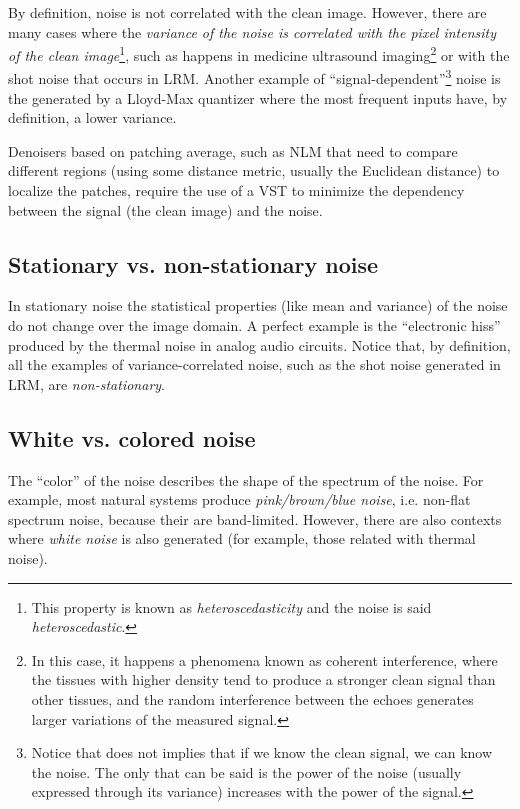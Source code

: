 By definition, noise is not correlated with the clean image. However,
there are many cases where the \emph{variance of the noise is
correlated with the pixel intensity of the clean image}\footnote{This
property is known as \emph{heteroscedasticity} and the noise is said
\emph{heteroscedastic}.}, such as happens in medicine ultrasound
imaging\footnote{In this case, it happens a phenomena known as
coherent interference, where the tissues with higher density tend to
produce a stronger clean signal than other tissues, and the random
interference between the echoes generates larger variations of the
measured signal.} or with the shot noise that occurs in
\gls{LRM}. Another example of ``signal-dependent''\footnote{Notice
that does not implies that if we know the clean signal, we can know
the noise. The only that can be said is the power of the noise
(usually expressed through its variance) increases with the power of
the signal.} noise is the generated by a Lloyd-Max quantizer where the
most frequent inputs have, by definition, a lower variance.

Denoisers based on patching average, such as \gls{NLM} that need to
compare different regions (using some distance metric, usually the
Euclidean distance) to localize the patches, require the use of a
\gls{VST} to minimize the dependency between the signal (the clean
image) and the noise.


\subsection{Stationary vs. non-stationary noise}

In stationary noise the statistical properties (like mean and
variance) of the noise do not change over the image domain. A perfect
example is the ``electronic hiss'' produced by the thermal noise in
analog audio circuits. Notice that, by definition, all the examples of
variance-correlated noise, such as the shot noise generated in
\gls{LRM}, are \emph{non-stationary}.


\subsection{White vs. colored noise}

The ``color'' of the noise describes the shape of the spectrum of the
noise. For example, most natural systems produce \emph{pink/brown/blue
  noise}, i.e. non-flat spectrum noise, because their are
band-limited. However, there are also contexts where \emph{white
  noise} is also generated (for example, those related with thermal
noise).

